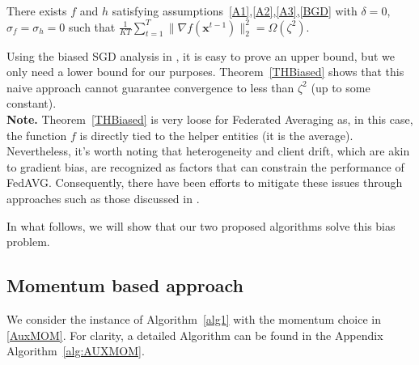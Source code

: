 \documentclass[10pt]{article} %
\theoremstyle{plain}
\theoremstyle{definition}
\theoremstyle{remark}
\newcommand{\norm}[1]{\|#1\|_2}
\def\vx{{\bm{x}}}
\begin{document}
\begin{framedtheorem}\label{THBiased}
There exists $f$ and $h$ satisfying  assumptions~\ref{A1},\ref{A2},\ref{A3},\ref{BGD} with $\delta=0$, $\sigma_f=\sigma_h=0$ such that $\frac{1}{KT}\sum_{t=1}^T\norm{\nabla f(\vx^{t-1})}^2 = \Omega (\zeta^2)$.
\end{framedtheorem}
Using the biased SGD analysis in \citep{BiasedSGD}, it is easy to prove an upper bound, but we only need a lower bound for our purposes. Theorem~\ref{THBiased} shows that this naive approach cannot guarantee convergence to less than $\zeta^2$ (up to some constant). \\
\textbf{Note.} Theorem~\ref{THBiased} is very loose for Federated Averaging as, in this case, the function $f$ is directly tied to the helper entities (it is the average). Nevertheless, it's worth noting that heterogeneity and client drift, which are akin to gradient bias, are recognized as factors that can constrain the performance of FedAVG. Consequently, there have been efforts to mitigate these issues through approaches such as those discussed in \citep{karimireddy2019scaffold, MiMe}.

In what follows, we will show that our two proposed algorithms solve this bias problem.


\subsection{Momentum based approach}
We consider the instance of Algorithm~\ref{alg1} with the momentum choice in \eqref{AuxMOM}. For clarity, a detailed Algorithm can be found in the Appendix  Algorithm~\ref{alg:AUXMOM}.
\end{document}

